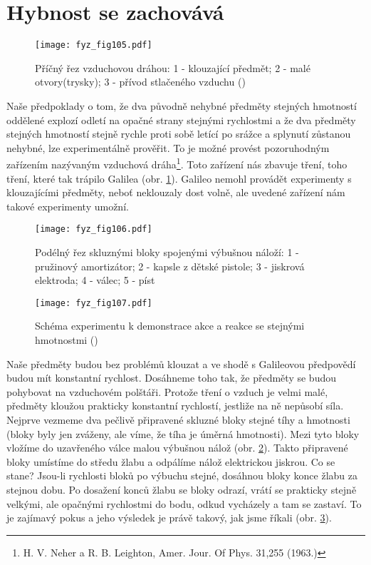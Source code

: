   \section{Hybnost se zachovává}
    
    \begin{figure}[ht!]  %
      \centering
      \texttt{[image: fyz\_fig105.pdf]}
      \caption{Příčný řez vzduchovou dráhou: 1 - klouzající předmět; 2 - malé otvory(trysky); 3 -  
               přívod stlačeného vzduchu (\cite[s.~143]{Feynman01})}
      \label{fyz:fig105}
    \end{figure}
    Naše předpoklady o tom, že dva původně nehybné předměty stejných hmotností oddělené explozí 
    odletí na opačné strany stejnými rychlostmi a že dva předměty stejných hmotností stejně rychle 
    proti sobě letící po srážce a splynutí zůstanou nehybné, lze experimentálně prověřit. To je 
    možné provést pozoruhodným zařízením nazývaným vzduchová dráha\footnote{H. V. Neher a R. B. 
    Leighton, Amer. Jour. Of Phys. 31,255 (1963.)}. Toto zařízení nás zbavuje tření, toho tření, 
    které tak trápilo Galilea (obr. \ref{fyz:fig105}). Galileo nemohl provádět experimenty s 
    klouzajícími předměty, neboť neklouzaly dost volně, ale uvedené zařízení nám takové experimenty 
    umožní.

    \begin{figure}[ht!]  %
      \centering
      \texttt{[image: fyz\_fig106.pdf]}
      \caption{Podélný řez skluznými bloky spojenými výbušnou náloží: 1 - pružinový amortizátor; 2 - kapsle 
               z dětské pistole; 3 - jiskrová elektroda; 4 - válec; 5 - píst      
                \cite[s.~144]{Feynman01}}
       \label{fyz:fig106}     
    \end{figure}

    \begin{figure}[ht!]  %
      \centering
      \texttt{[image: fyz\_fig107.pdf]}
      \caption{Schéma experimentu k demonstrace akce a reakce se stejnými hmotnostmi  
               (\cite[s.~144]{Feynman01})}
      \label{fyz:fig107}
    \end{figure}
    Naše předměty budou bez problémů klouzat a ve shodě s Galileovou předpovědí budou mít 
    konstantní rychlost. Dosáhneme toho tak, že předměty se budou pohybovat na vzduchovém polštáři. 
    Protože tření o vzduch je velmi malé, předměty kloužou prakticky konstantní rychlostí, jestliže 
    na ně nepůsobí síla. Nejprve vezmeme dva pečlivě připravené skluzné bloky stejné tíhy a 
    hmotnosti (bloky byly jen zváženy, ale víme, že tíha je úměrná hmotnosti). Mezi tyto bloky 
    vložíme do uzavřeného válce malou výbušnou nálož (obr. \ref{fyz:fig106}). Takto připravené 
    bloky umístíme do středu žlabu a odpálíme nálož elektrickou jiskrou. Co se stane? Jsou-li 
    rychlosti bloků po výbuchu stejné, dosáhnou bloky konce žlabu za stejnou dobu. Po dosažení 
    konců žlabu se bloky odrazí, vrátí se prakticky stejně velkými, ale opačnými rychlostmi 
    do bodu, odkud vycházely a tam se zastaví. To je zajímavý pokus a jeho výsledek je právě 
    takový, jak jsme říkali (obr. \ref{fyz:fig107}).

